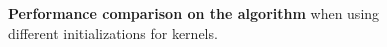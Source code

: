\begin{figure}
%		
%			
%				
%		
%		
%			
\caption{\textbf{Performance comparison on the \ppo algorithm} when using different initializations for kernels.} 
\label{fig:initializer}
\end{figure} 
